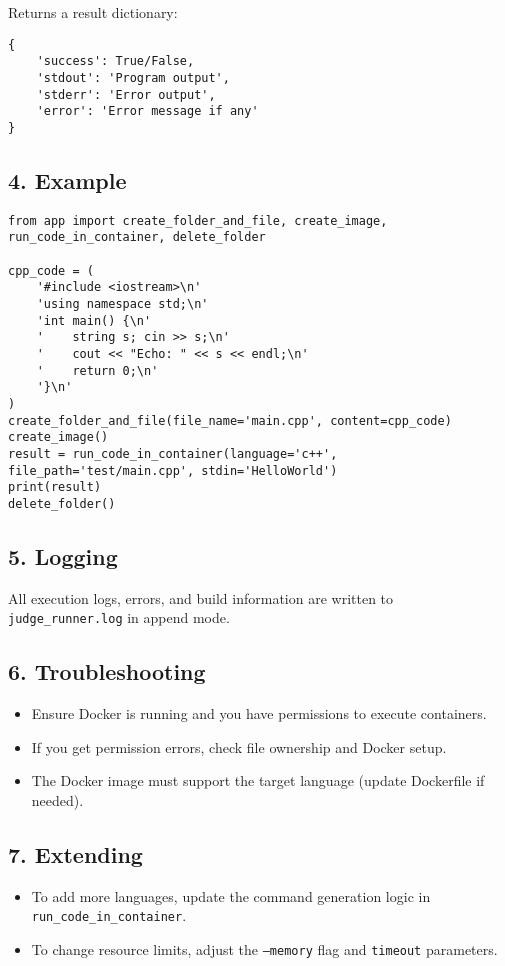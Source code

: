 \documentclass{article}
\begin{document}
Returns a result dictionary:
\begin{verbatim}
{
    'success': True/False,
    'stdout': 'Program output',
    'stderr': 'Error output',
    'error': 'Error message if any'
}
\end{verbatim}

\subsection*{4. Example}
\begin{verbatim}
from app import create_folder_and_file, create_image, run_code_in_container, delete_folder

cpp_code = (
    '#include <iostream>\n'
    'using namespace std;\n'
    'int main() {\n'
    '    string s; cin >> s;\n'
    '    cout << "Echo: " << s << endl;\n'
    '    return 0;\n'
    '}\n'
)
create_folder_and_file(file_name='main.cpp', content=cpp_code)
create_image()
result = run_code_in_container(language='c++', file_path='test/main.cpp', stdin='HelloWorld')
print(result)
delete_folder()
\end{verbatim}

\subsection*{5. Logging}
All execution logs, errors, and build information are written to \texttt{judge\_runner.log} in append mode.

\subsection*{6. Troubleshooting}
\begin{itemize}
    \item Ensure Docker is running and you have permissions to execute containers.
    \item If you get permission errors, check file ownership and Docker setup.
    \item The Docker image must support the target language (update Dockerfile if needed).
\end{itemize}

\subsection*{7. Extending}
\begin{itemize}
    \item To add more languages, update the command generation logic in \texttt{run\_code\_in\_container}.
    \item To change resource limits, adjust the \texttt{--memory} flag and \texttt{timeout} parameters.
\end{itemize}
\end{document}
